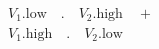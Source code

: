 \documentclass[preview]{standalone}
\begin{document}
\begin{align*}
V_1.\text{low}\quad.\quad V_2.\text{high} \quad + \\V_1.\text{high}\quad.\quad V_2.\text{low}
\end{align*}
\end{document}
